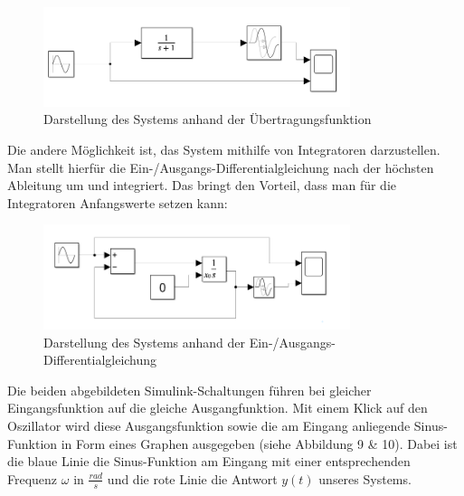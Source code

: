 \begin{figure}[H]
    \centering
    \includegraphics[width=0.8\textwidth]{Bilder/SimulinkEinfach.png}
    \caption{Darstellung des Systems anhand der Übertragungsfunktion}
 \end{figure}
Die andere Möglichkeit ist, das System mithilfe von Integratoren darzustellen. Man stellt hierfür die Ein-/Ausgangs-Differentialgleichung nach der höchsten Ableitung um und integriert. Das bringt den Vorteil, dass man für die Integratoren Anfangswerte setzen kann:


 \begin{figure}[H]
    \centering
    \includegraphics[width=0.8\textwidth]{Bilder/SimulinkKomplex.png}
    \caption{Darstellung des Systems anhand der Ein-/Ausgangs-Differentialgleichung}
 \end{figure}
Die beiden abgebildeten Simulink-Schaltungen führen bei gleicher Eingangsfunktion auf die gleiche Ausgangfunktion.
Mit einem Klick auf den Oszillator wird diese Ausgangsfunktion sowie die am Eingang anliegende Sinus-Funktion in Form eines Graphen ausgegeben (siehe Abbildung 9 \& 10). Dabei ist die blaue Linie die Sinus-Funktion am Eingang mit einer entsprechenden Frequenz $\omega$ in $\frac{rad}{s}$ und die rote Linie die Antwort $y(t)$ unseres Systems.

